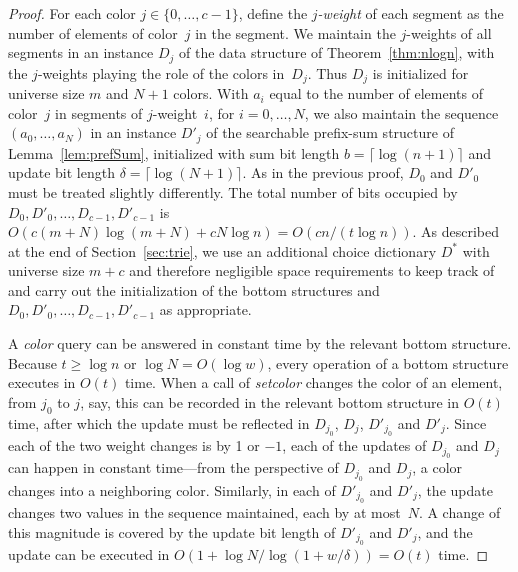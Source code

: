 \documentclass[envcountsame,envcountsect,undated,nolinenumbers]{lnthi}
\def\Tvn#1{\hbox{\textit{#1\/}}}
\def\Tceil#1{\lceil #1\rceil}
\begin{document}
\begin{proof}
For each color $j\in\{0,\ldots,c-1\}$,
define the \emph{$j$-weight} of each segment
as the number of elements of color~$j$
in the segment.
We maintain the $j$-weights of all segments in an
instance $D_j$
of the data structure of Theorem~\ref{thm:nlogn},
with the $j$-weights
playing the role of the colors in~$D_j$.
Thus $D_j$ is initialized for universe size $m$
and $N+1$ colors.
With $a_i$ equal to the number of
elements of color~$j$ in segments of $j$-weight~$i$,
for $i=0,\ldots,N$, we also maintain the sequence
$(a_0,\ldots,a_N)$ in an instance $D'_j$ of the
searchable prefix-sum structure of Lemma~\ref{lem:prefSum},
initialized with sum bit length
$b=\Tceil{\log(n+1)}$
and update bit length
$\delta=\Tceil{\log(N+1)}$.
As in the previous proof, $D_0$ and $D'_0$ must
be treated slightly differently.
The total number of
bits occupied by
$D_0,D'_0,\ldots,D_{c-1},D'_{c-1}$ is
$O(c(m+N)\log(m+N)+c N\log n)=O({cn/{(t\log n)}})$.
As described at the end of Section~\ref{sec:trie},
we use an additional choice dictionary $D^*$ with
universe size $m+c$ and therefore
negligible space requirements to keep track
of and carry out the initialization of
the bottom structures and
$D_0,D'_0,\ldots,D_{c-1},D'_{c-1}$
as appropriate.

A \Tvn{color} query can be answered in
constant time by the relevant bottom structure.
Because $t\ge\log n$ or $\log N=O(\log w)$,
every operation of a bottom structure
executes in $O(t)$ time.
When a call of \Tvn{setcolor} changes the
color of an element, from $j_0$ to $j$, say,
this can be recorded in the relevant
bottom structure in $O(t)$ time, after which
the update must be reflected in $D_{j_0}$,
$D_j$, $D'_{j_0}$ and $D'_j$.
Since each of the two weight changes is
by 1 or $-1$, 
each of the updates of $D_{j_0}$ and $D_j$
can happen in constant time---from the
perspective of $D_{j_0}$ and $D_j$,
a color changes into a neighboring color.
Similarly, in each of $D'_{j_0}$ and $D'_j$,
the update changes two values in the sequence
maintained, each by at most~$N$.
A change of this magnitude is covered by the
update bit length of $D'_{j_0}$ and $D'_j$,
and the update can be executed
in $O(1+{{\log N}/{\log(1+{w/\delta})}})=
O(t)$ time.


\end{proof}
\end{document}
